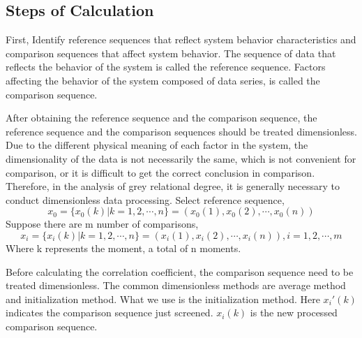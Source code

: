 \documentclass{mcmthesis}
\begin{document}
\subsection{Steps of Calculation}
First, Identify reference sequences that reflect system behavior characteristics and comparison sequences that affect system behavior.
The sequence of data that reflects the behavior of the system is called the reference sequence. Factors affecting the behavior of the system composed of data series, is called the comparison sequence.

After obtaining the reference sequence and the comparison sequence, the reference sequence and the comparison sequences should be treated dimensionless.
Due to the different physical meaning of each factor in the system, the dimensionality of the data is not necessarily the same, which is not convenient for comparison, or it is difficult to get the correct conclusion in comparison. Therefore, in the analysis of grey relational degree, it is generally necessary to conduct dimensionless data processing.
\newline
Select reference sequence,
\begin{equation}
  x_0 = \{x_0(k) | k=1,2,\cdots,n \} = (x_0(1), x_0(2), \cdots, x_0(n))
\end{equation}
Suppose there are m number of comparisons,
\begin{equation}
x_i = \{x_i(k) | k=1,2,\cdots,n\} = (x_i(1), x_i(2), \cdots, x_i(n)), i = 1,2,\cdots,m 
\end{equation}
Where k represents the moment, a total of n moments.

Before calculating the correlation coefficient, the comparison sequence need to be treated dimensionless. The common dimensionless methods are average method and initialization method.
What we use is the initialization method.
Here $ x_i '(k) $ indicates the comparison sequence just screened. $ x_i (k) $ is the new processed comparison sequence.
\end{document}
